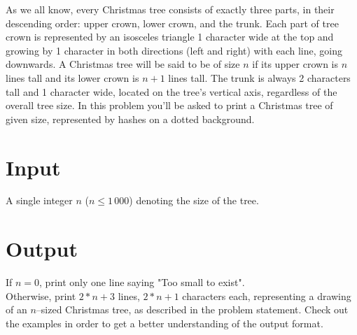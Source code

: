 \documentclass{spiral}
\begin{document}
  \makeheader

  As we all know, every Christmas tree consists of exactly three parts,
  in their descending order: upper crown, lower crown, and the trunk.
  Each part of tree crown is represented by an isosceles triangle 1 character wide
  at the top and growing by 1 character in both directions (left and right) 
  with each line, going downwards.
  A Christmas tree will be said to be of size $n$ if its upper crown
  is $n$ lines tall and its lower crown is $n + 1$ lines tall. 
  The trunk is always 2 characters tall and 1 character wide, located on
  the tree's vertical axis, regardless of the overall tree size.
  In this problem you'll be asked to print a Christmas tree of given size,
  represented by hashes on a dotted background.

  \section{Input}

    A single integer $n$ ($n \leq 1\,000$) denoting the size of the tree.

  \section{Output}

    If $n=0$, print only one line saying "Too small to exist".\\
    Otherwise, print $2*n+3$ lines, $2*n+1$ characters each, representing a drawing 
    of an $n$–sized Christmas tree, as described in the problem statement.
    Check out the examples in order to get a better understanding of the output format.

\end{document}
